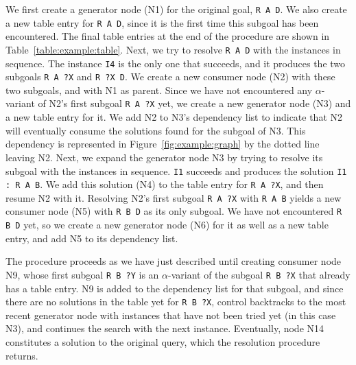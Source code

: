 \documentclass[runningheads]{llncs}
\begin{document}
We first create a generator node (N1) for the original goal, \lstinline{R A D}.
We also create a new table entry for \lstinline{R A D},
since it is the first time this subgoal has been encountered.
The final table entries at the end of the procedure are shown in Table~\ref{table:example:table}.
Next, we try to resolve \lstinline{R A D} with the instances in sequence.
The instance \lstinline{I4} is the only one that succeeds, and it produces the two subgoals \lstinline{R A ?X} and \lstinline{R ?X D}.
We create a new consumer node (N2) with these two subgoals, and with N1 as parent.
Since we have not encountered any $\alpha$-variant of N2's first subgoal \lstinline{R A ?X} yet,
we create a new generator node (N3) and a new table entry for it.
We add N2 to N3's dependency list to indicate that N2 will eventually consume
the solutions found for the subgoal of N3.
This dependency is represented in Figure~\ref{fig:example:graph} by the dotted line leaving N2.
Next, we expand the generator node N3 by trying to resolve its subgoal with the instances in sequence.
\lstinline{I1} succeeds and produces the solution \lstinline{I1 : R A B}. We add this solution (N4)
to the table entry for \lstinline{R A ?X}, and then resume N2 with it.
Resolving N2's first subgoal \lstinline{R A ?X} with \lstinline{R A B} yields
a new consumer node (N5) with \lstinline{R B D} as its only subgoal. We have not encountered \lstinline{R B D} yet,
so we create a new generator node (N6) for it as well as a new table entry, and add N5 to its dependency list.

The procedure proceeds as we have just described until creating consumer node N9,
whose first subgoal \lstinline{R B ?Y} is an $\alpha$-variant of the subgoal \lstinline{R B ?X} that already has a table entry.
N9 is added to the dependency list for that subgoal, and since there are no solutions in the table yet for \lstinline{R B ?X}, control backtracks
to the most recent generator node with instances that have not been tried yet (in this case N3),
and continues the search with the next instance.
Eventually, node N14 constitutes a solution to the original query, which the resolution procedure returns.
\end{document}
